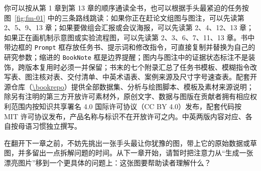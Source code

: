 你可以按从第 1 章到第 13 章的顺序通读全书，也可以根据手头最紧迫的任务按图~\ref{fig:fm-01} 中的三条路线跳读：如果你正在赶论文组图与图注，可以先读第 2、5、9、13 章；如果要做组会汇报或会议海报，可以先读第 2、4、12、13 章；如果正在画机制示意图或实验流程图，可以先读第 2、3、6、7、11、13 章。书中带边框的 \texttt{Prompt} 框存放任务书、提示词和修改指令，可直接复制并替换为自己的研究参数；缩进的 \texttt{BookNote} 框是边界提醒；图内与图注中的证据状态标注不是装饰，跨版本复用时必须一并保留；书末的七个附录汇总了任务书模板、模糊指令改写表、图注核对表、交付清单、中英术语表、案例来源及尺寸字号速查表。配套开源仓库（\url{\bookrepo}）提供全部数据集、分析与绘图脚本、模板及素材来源说明；除另有注明的第三方开放许可素材外，原创文字、数据与图版在贡献者拥有相应权利范围内按知识共享署名 4.0 国际许可协议（CC BY 4.0）发布，配套代码按 MIT 许可协议发布，产品名称与标识不在开放许可之内。中英两版内容对应、各自按母语习惯独立撰写。

在翻开下一章之前，不妨先挑出一张手头最让你犹豫的图，带上它的原始数据或草图，并多留出一点拆解问题的时间。从下一章开始，请暂时把注意力从“生成一张漂亮图片”移到一个更具体的问题上：这张图要帮助读者理解什么？

